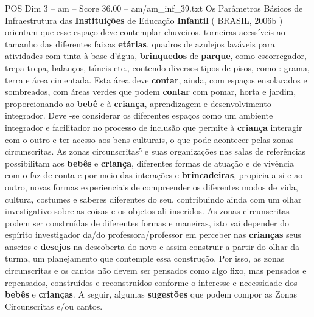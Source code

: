 \begin{textsample}{POS Dim 3 – am – Score 36.00 – am/am\_inf\_39.txt}
Os Parâmetros Básicos de Infraestrutura das \textbf{Instituições} de Educação \textbf{Infantil} ( BRASIL, 2006b ) orientam que esse espaço deve contemplar chuveiros, torneiras acessíveis ao tamanho das diferentes faixas \textbf{etárias}, quadros de azulejos laváveis para atividades com tinta à base d’água, \textbf{brinquedos} de \textbf{parque}, como escorregador, trepa-trepa, balanços, túneis etc., contendo diversos tipos de pisos, como : grama, terra e área cimentada.
Esta área deve \textbf{contar}, ainda, com espaços ensolarados e sombreados, com áreas verdes que podem \textbf{contar} com pomar, horta e jardim, proporcionando ao \textbf{bebê} e à \textbf{criança}, aprendizagem e desenvolvimento integrador.
Deve -se considerar os diferentes espaços como um ambiente integrador e facilitador no processo de inclusão que permite à \textbf{criança} interagir com o outro e ter acesso aos bens culturais, o que pode acontecer pelas zonas circunscritas.
As zonas circunscritas⁵ e suas organizações nas salas de referências possibilitam aos \textbf{bebês} e \textbf{criança}, diferentes formas de atuação e de vivência com o faz de conta e por meio das interações e \textbf{brincadeiras}, propicia a si e ao outro, novas formas experienciais de compreender os diferentes modos de vida, cultura, costumes e saberes diferentes do seu, contribuindo ainda com um olhar investigativo sobre as coisas e os objetos ali inseridos.
As zonas circunscritas podem ser construídas de diferentes formas e maneiras, isto vai depender do espírito investigador da/do professora/professor em perceber nas \textbf{crianças} seus anseios e \textbf{desejos} na descoberta do novo e assim construir a partir do olhar da turma, um planejamento que contemple essa construção.
Por isso, as zonas circunscritas e os cantos não devem ser pensados como algo fixo, mas pensados e repensados, construídos e reconstruídos conforme o interesse e necessidade dos \textbf{bebês} e \textbf{crianças}.
A seguir, algumas \textbf{sugestões} que podem compor as Zonas Circunscritas e/ou cantos.

\end{textsample}

